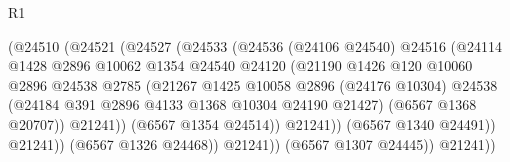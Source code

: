 \begin{lexlean}{R1}
\begin{coremodule}
                                      (@24510
                                        (@24521
                                          (@24527
                                            (@24533
                                              (@24536
                                                (@24106 @24540)
                                                @24516
                                                (@24114
                                                  @1428
                                                  @2896
                                                  @10062
                                                  @1354
                                                  @24540
                                                  @24120
                                                  (@21190
                                                    @1426
                                                    @120
                                                    @10060
                                                    @2896
                                                    @24538
                                                    @2785
                                                    (@21267
                                                      @1425
                                                      @10058
                                                      @2896
                                                      (@24176 @10304)
                                                      @24538
                                                      (@24184
                                                        @391
                                                        @2896
                                                        @4133
                                                        @1368
                                                        @10304
                                                        @24190
                                                        @21427)
                                                      (@6567 @1368 @20707))
                                                    @21241))
                                                (@6567 @1354 @24514))
                                              @21241))
                                          (@6567 @1340 @24491))
                                        @21241))
                                    (@6567 @1326 @24468))
                                  @21241))
                              (@6567 @1307 @24445))
                            @21241))

\end{coremodule}
\end{lexlean}
